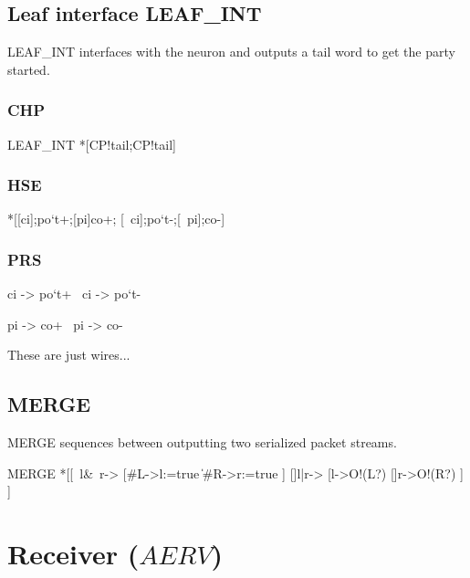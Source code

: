 \documentclass{article}
\begin{document}
\subsection{Leaf interface LEAF\_INT}

LEAF\_INT interfaces with the neuron and outputs a tail word to get the party started.

\subsubsection*{CHP}
\begin{csp}
LEAF_INT\equiv
  *[C\star\!P!\textrm{tail};C\star\!P!\textrm{tail}]
\end{csp}

\subsubsection*{HSE}
\begin{hse}
*[[ci];{po}`t+;[pi]co+;
  [~ci];{po}`t-;[~pi];co-]
\end{hse}

\subsubsection*{PRS}
\begin{prs2}
ci -> {po}`t+
~ci -> {po}`t-

pi -> co+
~pi -> co-
\end{prs2}

\noindent These are just wires...

\subsection{MERGE}

MERGE sequences between outputting two serialized packet streams.

\begin{csp}
MERGE\equiv
  *[[~l&~r->
      [#{L}->l:=true
      \|#{R}->r:=true
      ]
    []l|r->
      [l->O!(L?)
      []r->O!(R?)
    ]
  ]
\end{csp}

\section{Receiver ($AERV$)}
\end{document}
